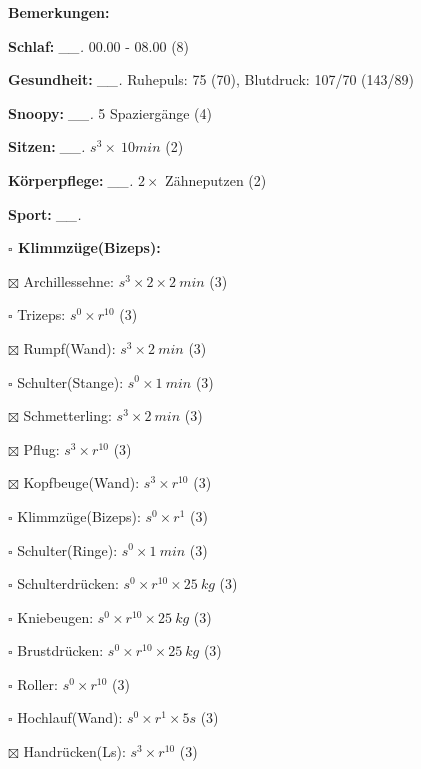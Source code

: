 \documentclass[10pt,a4paper]{article}
\newcommand\prop[1] {{\color {alizarin} {\bf #1}}}             %
\newcommand\mand[1] {{\color {burntorange} {\bf #1}}}          %
\newcommand\topspace{\vskip -15pt \hskip 20pt}
\newcommand\n[1] { {\sl #1.} \hskip 5pt }
\begin{document}
\begin{mdframed}[style=daystyle]
  \begin{labeling}{{\mand {Bemerkungen:}}}
    \setlength\itemsep{-3pt}
  \item[{\mand {Schlaf:}}]        \n{\_\_} 00.00 - 08.00 (8)
  \item[{\mand {Gesundheit:}}]    \n{\_\_} Ruhepuls: 75 (70), Blutdruck: 107/70 (143/89)
  \item[{\mand {Snoopy:}}]        \n{\_\_} 5 Spaziergänge (4)
  \item[{\mand {Sitzen:}}]        \n{\_\_} $s^3 \times\ 10 min$ (2)
  \item[{\mand {Körperpflege:}}]  \n{\_\_} $2 \times$ Zähneputzen (2)
  \item[{\mand {Sport:}}]         \n{\_\_}
    \topspace
    \begin{minipage}{0.75\textwidth}  
      \begin{labeling}{\prop {$\square$ {Klimmzüge(Bizeps):}}}
        \setlength\itemsep{-3pt}
      \item[$\boxtimes$ Archillessehne:]    $s^3 \times 2 \times 2\ min$ (3)
      \item[$\square$ Trizeps:]           $s^0 \times r^{10}$ (3)
      \item[$\boxtimes$ Rumpf(Wand):]       $s^3 \times 2\ min$ (3)
      \item[$\square$ Schulter(Stange):]  $s^0 \times 1\ min$ (3)
      \item[$\boxtimes$ Schmetterling:]     $s^3 \times 2\ min$ (3)
      \item[$\boxtimes$ Pflug:]             $s^3 \times r^{10}$ (3)
      \item[$\boxtimes$ Kopfbeuge(Wand):]   $s^3 \times r^{10}$ (3)
      \item[$\square$ Klimmzüge(Bizeps):] $s^0 \times r^1$ (3)
      \item[$\square$ Schulter(Ringe):]   $s^0 \times 1\ min$ (3)
      \item[$\square$ Schulterdrücken:]   $s^0 \times r^{10} \times 25\ kg$ (3)
      \item[$\square$ Kniebeugen:]        $s^0 \times r^{10} \times 25\ kg$ (3)
      \item[$\square$ Brustdrücken:]      $s^0 \times r^{10} \times 25\ kg$ (3)
      \item[$\square$ Roller:]            $s^0 \times r^{10}$ (3)
      \item[$\square$ Hochlauf(Wand):]    $s^0 \times r^{1} \times 5s$ (3)
      \item[$\boxtimes$ Handrücken(Ls):]    $s^3 \times r^{10}$ (3)

\end{labeling}
\end{minipage}
\end{labeling}
\end{mdframed}
\end{document}

